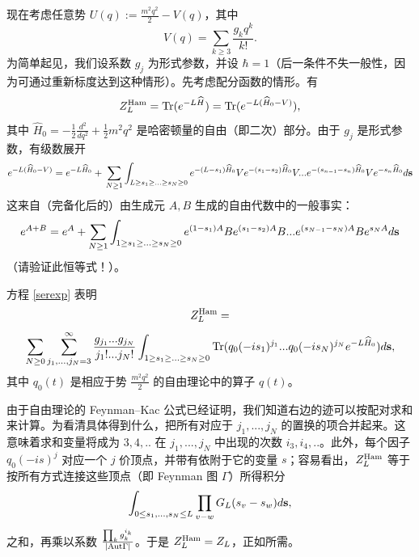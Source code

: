 现在考虑任意势
$U(q):=\frac{m^2q^2}{2}-V(q)$，其中
$$
V(q)=\sum_{k\ge 3}\frac{g_kq^k}{k!}. 
$$
为简单起见，我们设系数 $g_j$ 为形式参数，并设 $\hbar=1$（后一条件不失一般性，因为可通过重新标度达到这种情形）。先考虑配分函数的情形。有
$$
Z_L^{\rm Ham}=\Tr(e^{-L\widehat H})=\Tr(e^{-L(\widehat H_0-V)}),
$$ 
其中 $\widehat H_0=-\frac{1}{2}\frac{d^2}{dq^2}+\frac{1}{2}m^2q^2$ 是哈密顿量的自由（即二次）部分。由于 $g_j$ 是形式参数，有级数展开
\scriptsize
\begin{equation}\label{serexp}
e^{-L(\widehat H_0-V)}=e^{-L\widehat H_0}+\\
\sum_{N\ge 1}\int_{L\ge s_1\ge...\ge s_N\ge 0}
e^{-(L-s_1)\widehat H_0}Ve^{-(s_1-s_2)\widehat H_0}V...e^{-(s_{n-1}-s_n)\widehat
  H_0}Ve^{-s_n\widehat H_0}d\bold s
\end{equation}
\normalsize 这来自（完备化后的）由生成元 $A,B$ 生成的自由代数中的一般事实：
\begin{equation}\label{eAB}
e^{A+B}=e^A+\sum_{N\ge 1}\int_{1\ge s_1\ge...\ge s_N\ge 0}
e^{(1-s_1)A}Be^{(s_1-s_2)A}B...e^{(s_{N-1}-s_N)A}Be^{s_NA}d\bold s
\end{equation}
（请验证此恒等式！）。

方程 \eqref{serexp} 表明
$$ 
Z_L^{\rm Ham}=
$$
$$
\sum_{N\ge 0}\sum_{j_1,...,j_N=3}^\infty
\frac{g_{j_1}...g_{j_N}}{j_1!...j_N!}\int_{1\ge s_1\ge...\ge s_N\ge 0}
\Tr(q_0(-is_1)^{j_1}...q_0(-is_N)^{j_N}e^{-L\widehat H_0})d\bold s,
$$
其中 $q_0(t)$ 是相应于势 $\frac{m^2q^2}{2}$ 的自由理论中的算子 $q(t)$。

由于自由理论的 Feynman–Kac 公式已经证明，我们知道右边的迹可以按配对求和来计算。为看清具体得到什么，把所有对应于 $j_1,...,j_N$ 的置换的项合并起来。这意味着求和变量将成为 $3,4,..$ 在 $j_1,...,j_N$ 中出现的次数 $i_3,i_4,..$。此外，每个因子 $q_0(-is)^j$ 对应一个 $j$ 价顶点，并带有依附于它的变量 $s$；容易看出，$Z_L^{\rm Ham}$ 等于按所有方式连接这些顶点（即 Feynman 图 $\Gamma$）所得积分
$$
\int_{0\le s_1,...,s_N\le L}\prod_{v-w}
G_L(s_v-s_w)d\bold s, 
$$
之和，再乘以系数 $\frac{\prod_k g_k^{i_k}}{|{\rm Aut}\Gamma|}$。于是 $Z_L^{\rm Ham}=Z_L$，正如所需。


